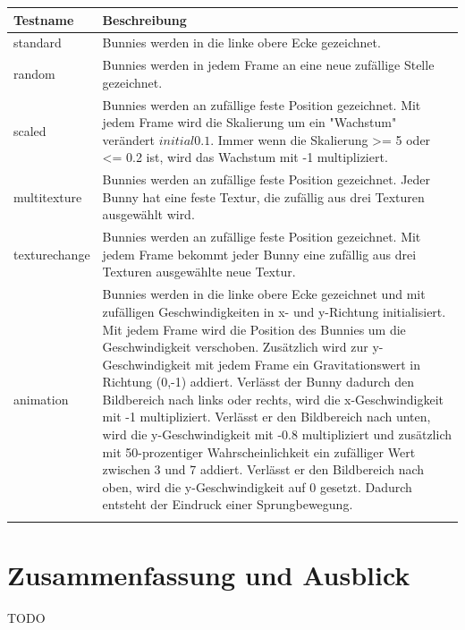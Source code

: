 \begin{center}
    \begin{tabular}{ | l | p{12cm} |}
    \hline
    Testname & Beschreibung \\ \hline
    standard & Bunnies werden in die linke obere Ecke gezeichnet.\\ \hline
    random & Bunnies werden in jedem Frame an eine neue zufällige Stelle gezeichnet.\\ \hline
    scaled & Bunnies werden an zufällige feste Position gezeichnet. Mit jedem Frame wird die Skalierung um ein "Wachstum" verändert \(initial 0.1\). Immer wenn die Skalierung >= 5 oder <= 0.2 ist, wird das Wachstum mit -1 multipliziert. \\ \hline
    multitexture & Bunnies werden an zufällige feste Position gezeichnet. Jeder Bunny hat eine feste Textur, die zufällig aus drei Texturen ausgewählt wird.\\ \hline
    texturechange & Bunnies werden an zufällige feste Position gezeichnet. Mit jedem Frame bekommt jeder Bunny eine zufällig aus drei Texturen ausgewählte neue Textur. \\ \hline
    animation & Bunnies werden in die linke obere Ecke gezeichnet und mit zufälligen Geschwindigkeiten in x- und y-Richtung initialisiert. Mit jedem Frame wird die Position des Bunnies um die Geschwindigkeit verschoben. Zusätzlich wird zur y-Geschwindigkeit mit jedem Frame ein Gravitationswert in Richtung (0,-1) addiert. Verlässt der Bunny dadurch den Bildbereich nach links oder rechts, wird die x-Geschwindigkeit mit -1 multipliziert. Verlässt er den Bildbereich nach unten, wird die y-Geschwindigkeit mit -0.8 multipliziert und zusätzlich mit 50-prozentiger Wahrscheinlichkeit ein zufälliger Wert zwischen 3 und 7 addiert. Verlässt er den Bildbereich nach oben, wird die y-Geschwindigkeit auf 0 gesetzt. Dadurch entsteht der Eindruck einer Sprungbewegung.\\ \hline
    \\ \hline
    \end{tabular}
\end{center}

\chapter{Zusammenfassung und Ausblick}
TODO
